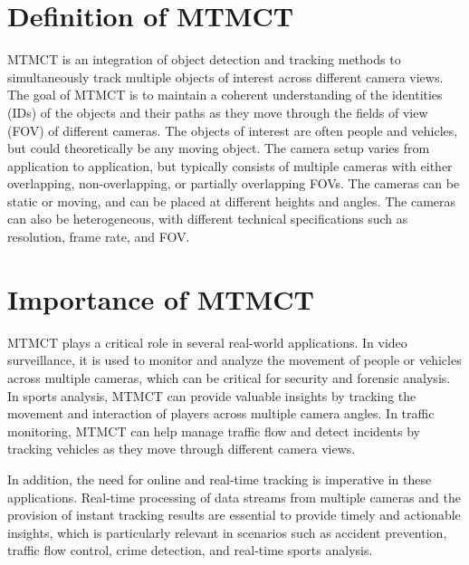 \section{Definition of MTMCT}\label{sec:definition_of_mtmct}
MTMCT is an integration of object detection and tracking methods to simultaneously track multiple objects of interest across different camera views. The goal of MTMCT is to maintain a coherent understanding of the identities (IDs) of the objects and their paths as they move through the fields of view (FOV) of different cameras. The objects of interest are often people and vehicles, but could theoretically be any moving object. The camera setup varies from application to application, but typically consists of multiple cameras with either overlapping, non-overlapping, or partially overlapping FOVs. The cameras can be static or moving, and can be placed at different heights and angles. The cameras can also be heterogeneous, with different technical specifications such as resolution, frame rate, and FOV.

\section{Importance of MTMCT}\label{sec:importance_of_mtmct}
MTMCT plays a critical role in several real-world applications. In video surveillance, it is used to monitor and analyze the movement of people or vehicles across multiple cameras, which can be critical for security and forensic analysis. In sports analysis, MTMCT can provide valuable insights by tracking the movement and interaction of players across multiple camera angles. In traffic monitoring, MTMCT can help manage traffic flow and detect incidents by tracking vehicles as they move through different camera views.

In addition, the need for online and real-time tracking is imperative in these applications. Real-time processing of data streams from multiple cameras and the provision of instant tracking results are essential to provide timely and actionable insights, which is particularly relevant in scenarios such as accident prevention, traffic flow control, crime detection, and real-time sports analysis.

